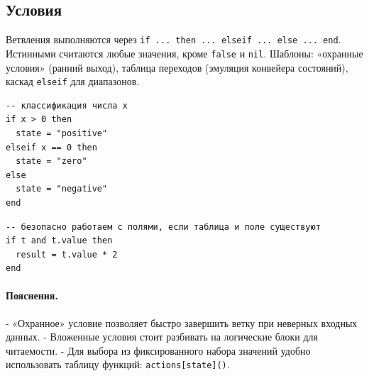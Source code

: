 \subsection{Условия}
Ветвления выполняются через \verb|if ... then ... elseif ... else ... end|. Истинными считаются любые значения, кроме \verb|false| и \verb|nil|. Шаблоны: «охранные условия» (ранний выход), таблица переходов (эмуляция конвейера состояний), каскад \verb|elseif| для диапазонов.
\begin{verbatim}
-- классификация числа x
if x > 0 then
  state = "positive"
elseif x == 0 then
  state = "zero"
else
  state = "negative"
end
\end{verbatim}
\begin{verbatim}
-- безопасно работаем с полями, если таблица и поле существуют
if t and t.value then
  result = t.value * 2
end
\end{verbatim}
\paragraph{Пояснения.}
- «Охранное» условие позволяет быстро завершить ветку при неверных входных данных.
- Вложенные условия стоит разбивать на логические блоки для читаемости.
- Для выбора из фиксированного набора значений удобно использовать таблицу функций: \verb|actions[state]()|.
